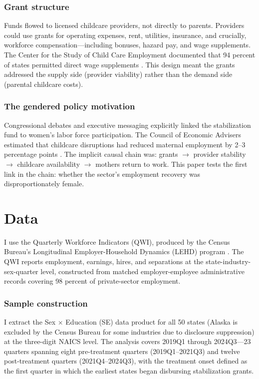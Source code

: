 \documentclass[12pt]{article}
\begin{document}
\subsubsection*{Grant structure} Funds flowed to licensed childcare providers, not directly to parents. Providers could use grants for operating expenses, rent, utilities, insurance, and crucially, workforce compensation---including bonuses, hazard pay, and wage supplements. The Center for the Study of Child Care Employment documented that 94 percent of states permitted direct wage supplements \citep{cscce2022}. This design meant the grants addressed the supply side (provider viability) rather than the demand side (parental childcare costs).

\subsubsection*{The gendered policy motivation} Congressional debates and executive messaging explicitly linked the stabilization fund to women's labor force participation. The Council of Economic Advisers estimated that childcare disruptions had reduced maternal employment by 2--3 percentage points \citep{cea2023childcare}. The implicit causal chain was: grants $\rightarrow$ provider stability $\rightarrow$ childcare availability $\rightarrow$ mothers return to work. This paper tests the first link in the chain: whether the sector's employment recovery was disproportionately female.

\section{Data}

I use the Quarterly Workforce Indicators (QWI), produced by the Census Bureau's Longitudinal Employer-Household Dynamics (LEHD) program \citep{abowd2009lehd}. The QWI reports employment, earnings, hires, and separations at the state-industry-sex-quarter level, constructed from matched employer-employee administrative records covering 98 percent of private-sector employment.

\subsubsection*{Sample construction} I extract the Sex $\times$ Education (SE) data product for all 50 states (Alaska is excluded by the Census Bureau for some industries due to disclosure suppression) at the three-digit NAICS level. The analysis covers 2019Q1 through 2024Q3---23 quarters spanning eight pre-treatment quarters (2019Q1--2021Q3) and twelve post-treatment quarters (2021Q4--2024Q3), with the treatment onset defined as the first quarter in which the earliest states began disbursing stabilization grants.
\end{document}
